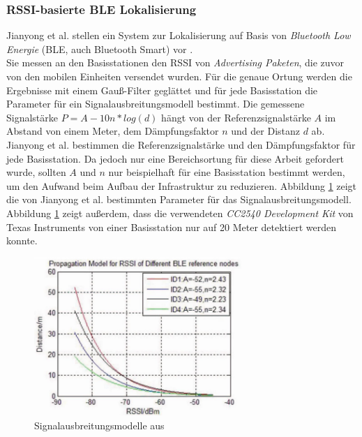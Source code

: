 \subsubsection{RSSI-basierte BLE Lokalisierung}
\label{ch:Vorherige:sec:adv}
Jianyong et al. stellen ein System zur Lokalisierung auf Basis von \emph{Bluetooth Low Energie} (BLE, auch Bluetooth Smart) vor \cite{jianyong2014rssi}. \\
Sie messen an den Basisstationen den RSSI von \emph{Advertising Paketen}, die zuvor von den mobilen Einheiten versendet wurden.
Für die genaue Ortung werden die Ergebnisse mit einem Gauß-Filter geglättet und für jede Basisstation die Parameter für ein Signalausbreitungsmodell bestimmt.
Die gemessene Signalstärke $P = A - 10n*log(d)$ hängt von der Referenzsignalstärke $A$ im Abstand von einem Meter, dem Dämpfungsfaktor $n$ und der Distanz $d$ ab. \\
Jianyong et al. bestimmen die Referenzsignalstärke und den Dämpfungsfaktor für jede Basisstation.
Da jedoch nur eine Bereichsortung für diese Arbeit gefordert wurde, sollten $A$ und $n$ nur beispielhaft für eine Basisstation bestimmt werden, um den Aufwand beim Aufbau der Infrastruktur zu reduzieren.
Abbildung \ref{fig:blemodel} zeigt die von Jianyong et al. bestimmten Parameter für das Signalausbreitungsmodell. 
Abbildung \ref{fig:blemodel} zeigt außerdem, dass die verwendeten \emph{CC2540 Development Kit} von Texas Instruments von einer Basisstation nur auf 20 Meter detektiert werden konnte.


\begin{figure}[h]
  \centering
	\includegraphics[width=0.7\textwidth]{images/blemodel.png}
  \caption{Signalausbreitungsmodelle aus \cite{jianyong2014rssi}}
  \label{fig:blemodel}
\end{figure}

